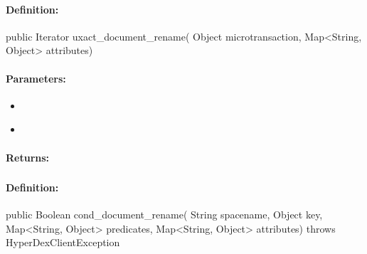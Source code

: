 \paragraph{Definition:}
\begin{javacode}
public Iterator uxact_document_rename(
        Object microtransaction,
        Map<String, Object> attributes)
\end{javacode}

\paragraph{Parameters:}
\begin{itemize}[noitemsep]
\item {}\\

\item {}\\

\end{itemize}

\paragraph{Returns:}


\pagebreak
\subsubsection{}
\label{api:java:cond_document_rename}


\paragraph{Definition:}
\begin{javacode}
public Boolean cond_document_rename(
        String spacename,
        Object key,
        Map<String, Object> predicates,
        Map<String, Object> attributes) throws HyperDexClientException
\end{javacode}


